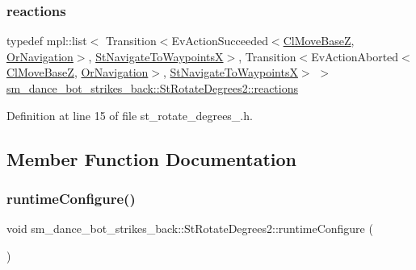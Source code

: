 \subsubsection{\texorpdfstring{reactions}{reactions}}
{\footnotesize\ttfamily typedef mpl\+::list$<$ Transition$<$Ev\+Action\+Succeeded$<$\hyperlink{classmove__base__z__client_1_1ClMoveBaseZ}{Cl\+Move\+BaseZ}, \hyperlink{classsm__dance__bot__strikes__back_1_1OrNavigation}{Or\+Navigation}$>$, \hyperlink{structsm__dance__bot__strikes__back_1_1StNavigateToWaypointsX}{St\+Navigate\+To\+WaypointsX}$>$, Transition$<$Ev\+Action\+Aborted$<$\hyperlink{classmove__base__z__client_1_1ClMoveBaseZ}{Cl\+Move\+BaseZ}, \hyperlink{classsm__dance__bot__strikes__back_1_1OrNavigation}{Or\+Navigation}$>$, \hyperlink{structsm__dance__bot__strikes__back_1_1StNavigateToWaypointsX}{St\+Navigate\+To\+WaypointsX}$>$ $>$ \hyperlink{structsm__dance__bot__strikes__back_1_1StRotateDegrees2_a15ea014ebb51ef518b9d757812973351}{sm\+\_\+dance\+\_\+bot\+\_\+strikes\+\_\+back\+::\+St\+Rotate\+Degrees2\+::reactions}}



Definition at line 15 of file st\+\_\+rotate\+\_\+degrees\+\_.\+h.



\subsection{Member Function Documentation}
\mbox{\label{structsm__dance__bot__strikes__back_1_1StRotateDegrees2_a5deec1794efd564280833dd687c5a436}} 
\subsubsection{\texorpdfstring{runtime\+Configure()}{runtimeConfigure()}}
{\footnotesize\ttfamily void sm\+\_\+dance\+\_\+bot\+\_\+strikes\+\_\+back\+::\+St\+Rotate\+Degrees2\+::runtime\+Configure (\begin{DoxyParamCaption}{ }\end{DoxyParamCaption})\hspace{0.3cm}{\ttfamily [inline]}}



